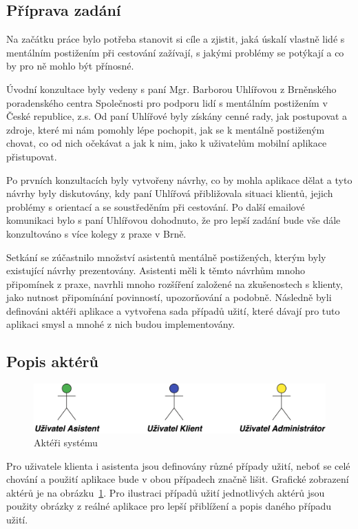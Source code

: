 \documentclass[czech,master,public,dept460,male,java,cpdeclaration]{diploma}
\begin{document}
\subsection{Příprava zadání}

Na začátku práce bylo potřeba stanovit si cíle a zjistit, jaká úskalí vlastně lidé s mentálním
postižením při cestování zažívají, s jakými problémy se potýkají a co by pro ně mohlo být přínosné.

Úvodní konzultace byly vedeny s paní Mgr. Barborou Uhlířovou z Brněnského poradenského centra
Společnosti pro podporu lidí s mentálním postižením v České republice, z.s. Od paní Uhlířové byly získány
 cenné rady, jak postupovat a zdroje, které mi nám pomohly lépe pochopit, jak se k mentálně postiženým chovat,
 co od nich očekávat a jak k nim, jako k uživatelům mobilní aplikace přistupovat.

Po prvních konzultacích byly vytvořeny návrhy, co by mohla aplikace dělat a tyto návrhy byly diskutovány,
kdy paní Uhlířová přibližovala situaci klientů, jejich problémy s orientací a se soustředěním při cestování.
Po další emailové komunikaci bylo s paní Uhlířovou dohodnuto, že pro lepší zadání bude vše dále
konzultováno s více kolegy z praxe v Brně.

Setkání se zúčastnilo množství asistentů mentálně postižených, kterým byly existující návrhy prezentovány.
Asistenti měli k těmto návrhům mnoho připomínek z praxe, navrhli mnoho rozšíření založené na zkušenostech
s klienty, jako nutnost připomínání povinností, upozorňování a podobně.
Následně byli definováni aktéři aplikace a vytvořena sada případů užití,
které dávají pro tuto aplikaci smysl a mnohé z nich budou implementovány.

\subsection{Popis aktérů}
\begin{figure}[H]
        \centering
                \includegraphics[scale=0.14]{img/actors.png}
        \caption{Aktéři systému}
        \label{fig:actors}
\end{figure}

Pro uživatele klienta i asistenta jsou definovány různé případy užití, neboť se celé chování
a použití aplikace bude v obou případech značně lišit. Grafické zobrazení aktérů je na obrázku~\ref{fig:actors}.
Pro ilustraci případů užití jednotlivých aktérů jsou použity obrázky z reálné aplikace pro
lepší přiblížení a popis daného případu užití.
\end{document}
